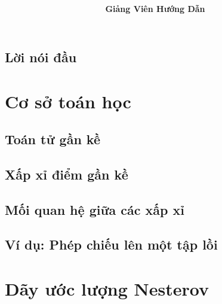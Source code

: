 \documentclass[12pt,twoside, a4paper, openany]{report}
\title{\begin{huge}
\textbf{\mytitle}
\end{huge}}
\author{\textbf{\mygroup}\\
\vspace{3pt}
\mymembers\\
\textbf{Giảng Viên Hướng Dẫn}\\
\vspace{3pt}
\mysupervisor}
\date{\mylongdate}
\theoremstyle{plain}
\theoremstyle{definition}
\theoremstyle{remark}
\begin{document}
\nocite{salzovilla2012}
\maketitle
\newpage
\tableofcontents
\newpage
\setcounter{chapter}{0}
\setcounter{section}{0}
\begin{center}\Large
    \section*{Lời nói đầu}
\end{center}

\newpage
%
%

\chapter{Cơ sở toán học}
\section{Toán tử gần kề}\label{sec:setting}

\section{Xấp xỉ điểm gần kề}

\section{Mối quan hệ giữa các xấp xỉ}

\section{Ví dụ: Phép chiếu lên một tập lồi}\label{sec:example-projection}

\chapter{Dãy ước lượng Nesterov}\label{sec:estimate}

\end{document}
